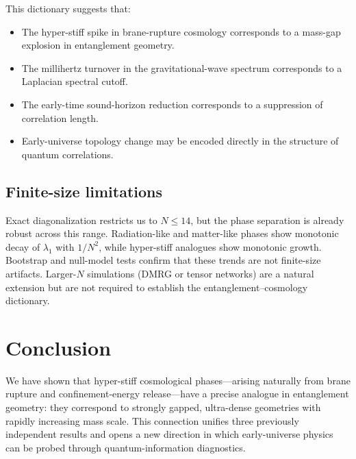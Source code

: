 \documentclass[11pt]{article}
\begin{document}
This dictionary suggests that:

\begin{itemize}
    \item The hyper-stiff spike in brane-rupture cosmology corresponds to a mass-gap explosion in entanglement geometry.
    \item The millihertz turnover in the gravitational-wave spectrum corresponds to a Laplacian spectral cutoff.
    \item The early-time sound-horizon reduction corresponds to a suppression of correlation length.
    \item Early-universe topology change may be encoded directly in the structure of quantum correlations.
\end{itemize}

\subsection*{Finite-size limitations}

Exact diagonalization restricts us to $N \leq 14$, but the phase separation is already robust across this range.  
Radiation-like and matter-like phases show monotonic decay of $\lambda_1$ with $1/N^2$, while hyper-stiff analogues show monotonic growth.  
Bootstrap and null-model tests confirm that these trends are not finite-size artifacts.  
Larger-$N$ simulations (DMRG or tensor networks) are a natural extension but are not required to establish the entanglement--cosmology dictionary.

\section{Conclusion}

We have shown that hyper-stiff cosmological phases---arising naturally from brane rupture and confinement-energy release---have a precise analogue in entanglement geometry: they correspond to strongly gapped, ultra-dense geometries with rapidly increasing mass scale. This connection unifies three previously independent results and opens a new direction in which early-universe physics can be probed through quantum-information diagnostics.
\end{document}
